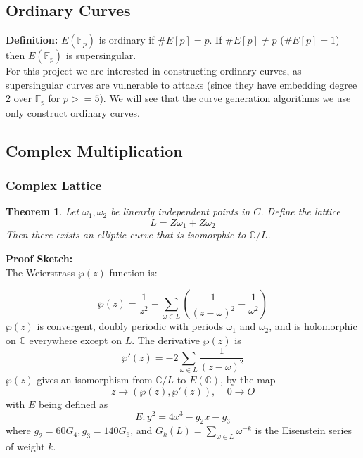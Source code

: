 \documentclass[12pt,twoside]{article}
\newtheorem{theorem}{Theorem}
\begin{document}
\subsection{Ordinary Curves}

{\bf Definition: } $E(\mathbb F_p)$ is ordinary if $\#E[p] = p$. If $\#E[p] \ne p$ ($\#E[p] = 1$) then $E(\mathbb F_p)$ is supersingular. \\


\noindent For this project we are interested in constructing ordinary curves, as supersingular curves are vulnerable to attacks (since they have embedding degree $2$ over $\mathbb F_p$ for $p >= 5$). We will see that the curve generation algorithms we use only construct ordinary curves.

\subsection{Complex Multiplication}
\subsubsection{Complex Lattice}
\begin{theorem} 
Let $\omega_{1}, \omega_{2}$ be linearly independent points in $C$.  Define the lattice 
$$ L = Z\omega_{1} + Z \omega_{2}$$ Then there exists an elliptic curve that is isomorphic to $\mathbb{C}/ L$. 
\end{theorem}
{\bf Proof Sketch:} \\

\noindent The Weierstrass $\wp (z) $ function is: 

\begin{equation} 
\wp(z) = \frac{1}{z^{2}} + \sum_{\omega \in L}\left(\frac{1}{(z-\omega)^{2}} - \frac{1}{\omega^{2}}\right) 
\end{equation}  
$\wp(z)$ is convergent, doubly periodic with periods $\omega_1$ and $\omega_2$, and is holomorphic on $\mathbb C$ everywhere except on $L$. The derivative $\wp(z)$ is 
\begin{equation} 
\wp ' (z) = -2 \sum_{\omega \in L} \frac{1}{(z- \omega)^{2}} 
\end{equation} 
$\wp(z)$ gives an isomorphism from $\mathbb{C}/L$ to $E(\mathbb{C})$, by the map $$z \rightarrow ( \wp(z), \wp' (z)), \> \> \> \> \> 0 \rightarrow O $$ with $E$ being defined as 
\begin{equation} 
E: y^{2} = 4x^{3} - g_{2}x - g_{3} 
\end{equation} 
where $g_{2} = 60G_{4}, g_{3} = 140G_{6}$, and $G_{k}(L) = \sum_{\omega \in L}\omega^{-k}$ is the Eisenstein series of weight $k$.
\end{document}
